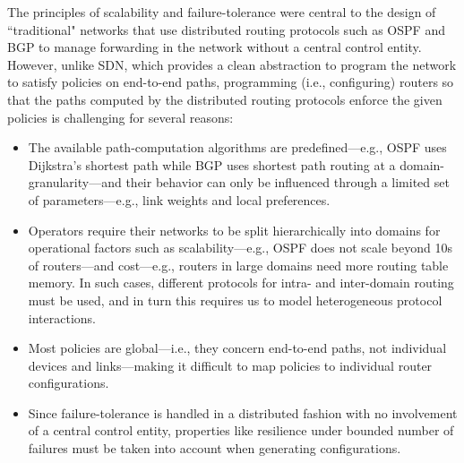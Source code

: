 The principles of scalability and failure-tolerance 
were central to the design
of ``traditional" networks that use distributed
routing protocols such as OSPF and BGP 
to manage forwarding in the 
network without a central control entity.
However, unlike SDN, which provides a clean abstraction
to program the network to satisfy policies 
on end-to-end paths,
programming (i.e., configuring) 
routers so that the paths computed by
the distributed routing protocols enforce the given 
policies is challenging for several reasons: 
\begin{itemize}
\item The available path-computation algorithms
 are predefined---e.g., OSPF uses
Dijkstra's shortest path while BGP uses shortest
path routing at a domain-granularity---and their behavior can only be influenced
through a limited set of parameters---e.g.,
 link weights and  local preferences.  
\item Operators require their networks to be split hierarchically into
  domains for operational factors such as scalability---e.g., OSPF does
  not scale beyond 10s of routers---and cost---e.g., routers in large domains
  need more routing table memory. In such cases, different protocols
  for intra- and inter-domain routing must be used, and in turn this
  requires us to model heterogeneous protocol interactions.
\item Most policies are
global---i.e., they concern end-to-end paths, not individual devices and
links---making it difficult to map policies to
individual router configurations. 
\item Since failure-tolerance is handled in a distributed 
fashion with no involvement of a central control entity,  
properties like resilience under bounded
number of failures must be taken into account when
generating  configurations. 

\end{itemize}



